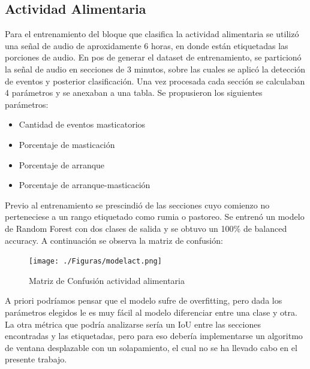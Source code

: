 \documentclass[11pt]{charter}
\begin{document}
\subsection{Actividad Alimentaria}
Para el entrenamiento del bloque que clasifica la actividad alimentaria se utilizó una señal de audio de aproxidamente 6 horas, en donde están etiquetadas las porciones de audio. 
En pos de generar el dataset de entrenamiento, se particionó la señal de audio en secciones de 3 minutos, sobre las cuales se aplicó la detección de eventos y posterior clasificación.
Una vez procesada cada sección se calculaban 4 parámetros y se anexaban a una tabla. Se propusieron los siguientes parámetros:

\begin{itemize}
	\item Cantidad de eventos masticatorios
	\item Porcentaje de masticación
	\item Porcentaje de arranque
	\item Porcentaje de arranque-masticación
\end{itemize}
Previo al entrenamiento se prescindió de las secciones cuyo comienzo no perteneciese a un rango etiquetado como rumia o pastoreo. Se entrenó un modelo de Random Forest con dos clases de salida y se obtuvo un 100\% de balanced accuracy. A continuación se observa la matriz de confusión:
\begin{figure}[H]
	\centering 
	\texttt{[image: ./Figuras/modelact.png]}
	\caption{Matriz de Confusión actividad alimentaria}
	\label{fig:act}
\end{figure}
A priori podríamos pensar que el modelo sufre de overfitting, pero dada los parámetros elegidos le es muy fácil al modelo diferenciar entre una clase y otra. La otra métrica que podría analizarse sería un IoU entre las secciones encontradas y las etiquetadas, pero para eso debería implementarse un algoritmo de ventana desplazable con un solapamiento, el cual no se ha llevado cabo en el presente trabajo.
\end{document}
